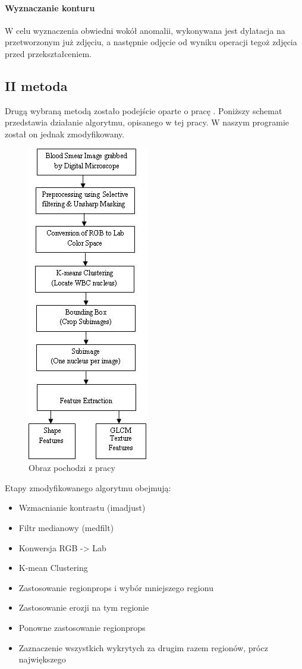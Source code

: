 \documentclass[11pt,openany]{sprawozdanie-agh}
\begin{document}
\paragraph{Wyznaczanie konturu\\}
W celu wyznaczenia obwiedni wokół anomalii, wykonywana jest dylatacja na przetworzonym już zdjęciu, a następnie odjęcie od wyniku operacji tegoż zdjęcia przed przekształceniem.

\subsection{II metoda}
Drugą wybraną metodą zostało podejście oparte o pracę \cite{Mohapatra:2011:ALD:1947940.1947980}. Poniższy schemat przedstawia działanie algorytmu, opisanego w tej pracy. W naszym programie został on jednak zmodyfikowany.

\begin{figure}[h!]
	\centering
		\includegraphics[scale=0.6]{schemat_Automated_Leukemia_Detection_in_Blood_Microscopic}
	\caption{Obraz pochodzi z pracy \cite{Mohapatra:2011:ALD:1947940.1947980}}
\end{figure}

Etapy zmodyfikowanego algorytmu obejmują:
\begin{itemize}
\item Wzmacnianie kontrastu (imadjust)
\item Filtr medianowy (medfilt)
\item Konwersja RGB -> Lab
\item K-mean Clustering
\item Zastosowanie regionprops i wybór mniejszego regionu 
\item Zastosowanie erozji na tym regionie 
\item Ponowne zastosowanie regionprops
\item Zaznaczenie wszystkich wykrytych za drugim razem regionów, prócz największego
\end{itemize}
\end{document}
